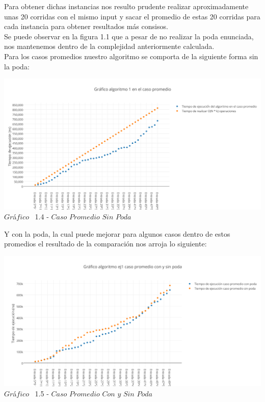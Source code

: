  Para obtener dichas instancias nos resulto prudente realizar aproximadamente unas 20 corridas con el mismo input y sacar el promedio de estas 20 corridas para cada instancia para obtener resultados m\'as consisos.\\ 

Se puede observar en la figura 1.1 que a pesar de no realizar la poda enunciada, nos mantenemos dentro de la complejidad anteriormente calculada.\\

Para los casos promedios nuestro algoritmo se comporta de la siguiente forma sin la poda: 

\vspace*{0.3cm} \vspace*{0.3cm}
  \begin{center}
 \includegraphics[scale=0.65]{./EJ1/promedio.png}
 {$Gr$\'a$fico$ \ 1.4 - $Caso$ $Promedio$ $Sin$ $Poda$}
  \end{center}
  \vspace*{0.3cm}
  
Y con la poda, la cual puede mejorar para algunos casos dentro de estos promedios el resultado de la comparaci\'on nos arroja lo siguiente:

\vspace*{0.3cm} \vspace*{0.3cm}
  \begin{center}
 \includegraphics[scale=0.65]{./EJ1/promedio1.png}
 {$Gr$\'a$fico$ \ 1.5 - $Caso$ $Promedio$ $Con$ $y$ $Sin$ $Poda$}
  \end{center}
  \vspace*{0.3cm}
  

